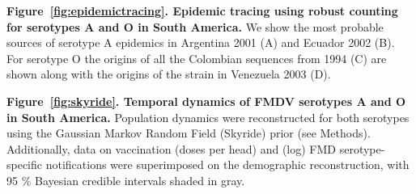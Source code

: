 \documentclass[10pt]{article}
\begin{document}
{\bf Figure~\ref{fig:epidemictracing}. Epidemic tracing using robust counting for serotypes A and O in South America.} We show the most probable sources of serotype A epidemics in Argentina 2001 (A) and Ecuador 2002 (B).
For serotype O the origins of  all the Colombian sequences from 1994 (C) are shown along with the origins of the strain in Venezuela 2003 (D).

{\bf Figure~\ref{fig:skyride}. Temporal dynamics of FMDV serotypes A and O in South America.} Population dynamics were reconstructed for both serotypes using the Gaussian Markov Random Field (Skyride) prior (see Methods).
Additionally, data on vaccination  (doses per head) and (log) FMD serotype-specific notifications were superimposed on the demographic reconstruction, with 95 \% Bayesian credible intervals shaded in gray.

\newpage
\end{document}
